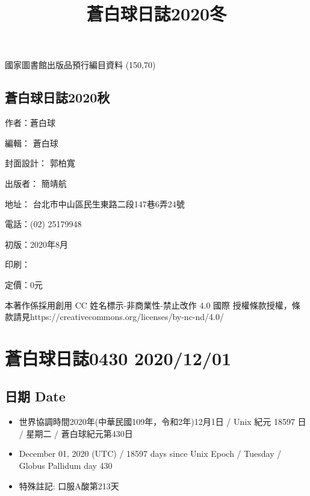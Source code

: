\documentclass[a5paper, 11pt
]{book}
\title{蒼白球日誌2020冬}
\date{}
\providecommand{\tightlist}{%
  \setlength{\itemsep}{0pt}\setlength{\parskip}{0pt}}
\begin{document}
\clearpage\maketitle
\thispagestyle{empty}
\subsection{}
\begin{flushleft}
國家圖書館出版品預行編目資料 \linebreak
\framebox(150,70){}
\end{flushleft}
\subsection{蒼白球日誌2020秋}
\begin{flushleft}
作者：蒼白球

編輯： 蒼白球

封面設計： 郭柏寬

出版者： 簡靖航

地址： 台北市中山區民生東路二段147巷6弄24號

電話：(02) 25179948

初版：2020年8月

印刷：

定價：0元

本著作係採用創用 CC 姓名標示-非商業性-禁止改作 4.0 國際 授權條款授權，條款請見\linebreak https://creativecommons.org/licenses/by-nc-nd/4.0/
\end{flushleft}
\clearpage
\tableofcontents

\hypertarget{ux84bcux767dux7403ux65e5ux8a8c0430-20201201}{%
\section{蒼白球日誌0430
2020/12/01}\label{ux84bcux767dux7403ux65e5ux8a8c0430-20201201}}

\hypertarget{ux65e5ux671f-date}{%
\subsection{日期 Date}\label{ux65e5ux671f-date}}

\begin{itemize}
\tightlist
\item
  世界協調時間2020年(中華民國109年，令和2年)12月1日 / Unix 紀元 18597 日
  / 星期二 / 蒼白球紀元第430日
\item
  December 01, 2020 (UTC) / 18597 days since Unix Epoch / Tuesday /
  Globus Pallidum day 430
\item
  特殊註記: 口服A酸第213天
\end{itemize}
\end{document}
